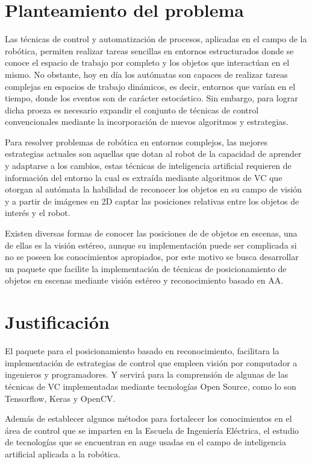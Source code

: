 \documentclass[letterpaper,titlepage,12pt,oneside,spanish,final]{report_eie}
\numberwithin{equation}{chapter}%
\numberwithin{figure}{chapter}%
\numberwithin{table}{chapter}%
\numberwithin{definition}{chapter}%
\numberwithin{lemma}{chapter}%
\numberwithin{theorem}{chapter}%
\numberwithin{corollary}{chapter}%
\numberwithin{condition}{chapter}%
\numberwithin{criterion}{chapter}%
\numberwithin{problem}{chapter}%
\numberwithin{property}{chapter}%
\numberwithin{proposition}{chapter}%
\numberwithin{solution}{chapter}%
\numberwithin{conjecture}{chapter}%
\begin{document}
\section*{Planteamiento del problema}
Las técnicas de control y automatización de procesos, aplicadas en el campo de la robótica, permiten realizar tareas sencillas en entornos estructurados donde se conoce el espacio de trabajo por completo y los objetos que interactúan en el mismo. No obstante, hoy en día los autómatas son capaces de realizar tareas complejas en espacios de trabajo dinámicos, es decir, entornos que varían en el tiempo, donde los eventos son de carácter estocástico. Sin embargo, para lograr dicha proeza es necesario expandir el conjunto de técnicas de control convencionales mediante la incorporación de nuevos algoritmos y estrategias.  

Para resolver problemas de robótica en entornos complejos, las mejores estrategias actuales son aquellas que dotan al robot de la capacidad de aprender y adaptarse a los cambios, estas técnicas de inteligencia artificial requieren de información del entorno la cual es extraída mediante algoritmos de VC que otorgan al autómata la habilidad de reconocer los objetos en su campo de visión y a partir de imágenes en 2D captar las posiciones relativas entre los objetos de interés y el robot. 

Existen diversas formas de conocer las posiciones de de objetos en escenas, una de ellas es la visión estéreo, aunque su implementación puede ser complicada si no se poseen los conocimientos apropiados, por este motivo se busca desarrollar un paquete que facilite la implementación de técnicas de posicionamiento de objetos en escenas mediante visión estéreo y reconocimiento basado en AA.
\section*{Justificación}
El paquete para el posicionamiento basado en reconocimiento, facilitara la implementación de estrategias de control que empleen visión por computador a ingenieros y programadores. Y servirá para la comprensión de algunas de las técnicas de VC implementadas mediante tecnologías Open Source, como lo son Tensorflow, Keras y OpenCV.

Además de establecer algunos métodos para fortalecer los conocimientos en el área de control  que se imparten en la Escuela de Ingeniería Eléctrica, el estudio de tecnologías que se encuentran en auge usadas en el campo de inteligencia artificial aplicada a la robótica. 
\end{document}

